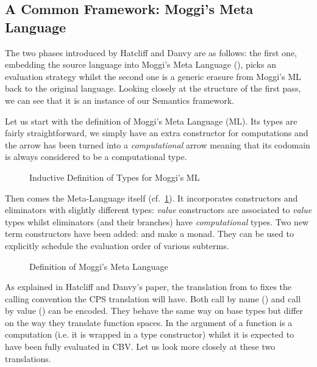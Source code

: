 \subsection{A Common Framework: Moggi's Meta Language}

The two phases introduced by Hatcliff and Danvy are as follows: the
first one, embedding the source language into Moggi's Meta Language
(\citeyear{moggi1991notions}),
picks an evaluation strategy whilst the second one is a generic erasure
from Moggi's ML back to the original language. Looking closely at the
structure of the first pass, we can see that it is an instance of our
Semantics framework.

Let us start with the definition of Moggi's Meta Language (ML). Its
types are fairly straightforward, we simply have an extra constructor
\AIC{\#\_} for computations and the arrow has been turned into a
\emph{computational} arrow meaning that its codomain is always considered
to be a computational type.

\begin{figure}[h]
\caption{Inductive Definition of Types for Moggi's ML}
\end{figure}

Then comes the Meta-Language itself (cf.~\cref{fig:moggiml}). It incorporates
 constructors and eliminators with slightly different types: \emph{value}
constructors are associated to \emph{value} types whilst eliminators (and their
branches) have \emph{computational} types. Two new term constructors have been
added:  and  make \AIC{\#\_} a monad. They can be used to
explicitly schedule the evaluation order of various subterms.

\begin{figure}[h]
\caption{Definition of Moggi's Meta Language\label{fig:moggiml}}
\end{figure}

As explained in Hatcliff and Danvy's paper, the translation from  to
 fixes the calling convention the CPS translation will have. Both call
by name () and call by value () can be encoded. They behave the
same way on base types but differ on the way they translate function spaces.
In  the argument of a function is a computation (i.e. it is wrapped in
a \AIC{\#\_} type constructor) whilst it is expected to have been fully evaluated
in CBV. Let us look more closely at these two translations.

